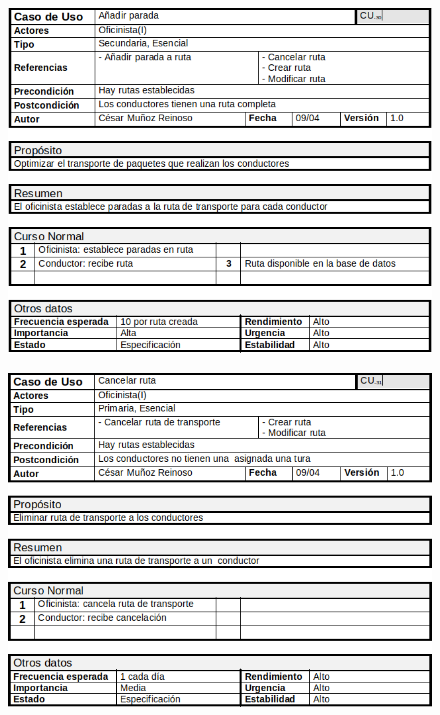 \begin{figure}[H]
	\centering
	\includegraphics[width=16cm]{8}
\end{figure}
\begin{figure}[H]
	\centering
	\includegraphics[width=16cm]{9}
\end{figure}
